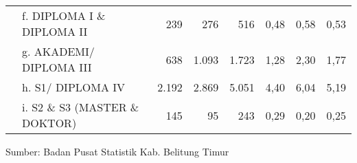 {\begin{tabular}{rY{25em}rrrrrr}
      & f. DIPLOMA I \& DIPLOMA II                         &    239 &    276 &    516 &  0,48 &  0,58 &  0,53 \\
      & g. AKADEMI/ DIPLOMA III                            &    638 &  1.093 &  1.723 &  1,28 &  2,30 &  1,77 \\
      & h. S1/ DIPLOMA IV                                  &  2.192 &  2.869 &  5.051 &  4,40 &  6,04 &  5,19 \\
      & i. S2 \& S3 (MASTER \& DOKTOR)                     &    145 &     95 &    243 &  0,29 &  0,20 &  0,25 \\
    \bottomrule
\end{tabular}%

}

\vfill
Sumber: Badan Pusat Statistik Kab. Belitung Timur\par 
